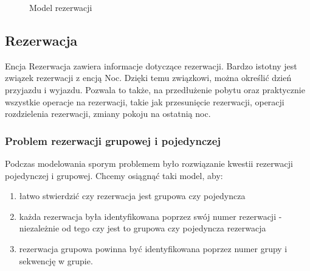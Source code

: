 \documentclass[a4paper,onecolumn,oneside,11pt,wide,floatssmall]{mwrep}
\theoremstyle{definition}
\theoremstyle{plain}%
\theoremstyle{remark}
\begin{document}
\begin{figure}[H]
  \begin{center}
  \end{center}
  \caption{Model rezerwacji}
  \label{fig:db-logical-model-reservation}
\end{figure}

\subsection{Rezerwacja}
Encja Rezerwacja zawiera informacje dotyczące rezerwacji. Bardzo istotny jest związek rezerwacji z encją Noc. Dzięki temu związkowi, można określić dzień przyjazdu i wyjazdu. Pozwala to także, na przedłużenie pobytu oraz praktycznie wszystkie operacje na rezerwacji, takie jak przesunięcie rezerwacji, operacji rozdzielenia rezerwacji, zmiany pokoju na ostatnią noc. 

\subsubsection{Problem rezerwacji grupowej i pojedynczej}

Podczas modelowania sporym problemem było rozwiązanie kwestii rezerwacji pojedynczej i grupowej. Chcemy osiągnąć taki model, aby:

\begin{enumerate}
  \item łatwo stwierdzić czy rezerwacja jest grupowa czy pojedyncza
  \item każda rezerwacja była identyfikowana poprzez swój numer rezerwacji - niezależnie od tego czy jest to grupowa czy pojedyncza rezerwacja
  \item rezerwacja grupowa powinna być identyfikowana poprzez numer grupy i sekwencję w grupie.
\end{enumerate}
\end{document}
